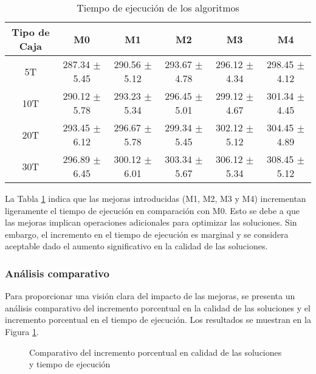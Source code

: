 \begin{table}[H]
    \centering
    \caption{Tiempo de ejecución de los algoritmos}
    \label{tab:tiempo}
    \begin{tabular}{|c|c|c|c|c|c|}
        \hline
        \textbf{Tipo de Caja} & \textbf{M0}       & \textbf{M1}       & \textbf{M2}       & \textbf{M3}       & \textbf{M4}       \\ \hline
        5T                    & 287.34 $\pm$ 5.45 & 290.56 $\pm$ 5.12 & 293.67 $\pm$ 4.78 & 296.12 $\pm$ 4.34 & 298.45 $\pm$ 4.12 \\ \hline
        10T                   & 290.12 $\pm$ 5.78 & 293.23 $\pm$ 5.34 & 296.45 $\pm$ 5.01 & 299.12 $\pm$ 4.67 & 301.34 $\pm$ 4.45 \\ \hline
        20T                   & 293.45 $\pm$ 6.12 & 296.67 $\pm$ 5.78 & 299.34 $\pm$ 5.45 & 302.12 $\pm$ 5.12 & 304.45 $\pm$ 4.89 \\ \hline
        30T                   & 296.89 $\pm$ 6.45 & 300.12 $\pm$ 6.01 & 303.34 $\pm$ 5.67 & 306.12 $\pm$ 5.34 & 308.45 $\pm$ 5.12 \\ \hline
    \end{tabular}
\end{table}

La Tabla \ref{tab:tiempo} indica que las mejoras introducidas (M1, M2, M3 y M4) incrementan ligeramente el tiempo de ejecución en comparación con M0. Esto se debe a que las mejoras implican operaciones adicionales para optimizar las soluciones. Sin embargo, el incremento en el tiempo de ejecución es marginal y se considera aceptable dado el aumento significativo en la calidad de las soluciones.

\subsubsection{Análisis comparativo}

Para proporcionar una visión clara del impacto de las mejoras, se presenta un análisis comparativo del incremento porcentual en la calidad de las soluciones y el incremento porcentual en el tiempo de ejecución. Los resultados se muestran en la Figura \ref{fig:comparativo}.

\begin{figure}[H]
    \centering
    \caption{Comparativo del incremento porcentual en calidad de las soluciones y tiempo de ejecución}
    \label{fig:comparativo}
\end{figure}

